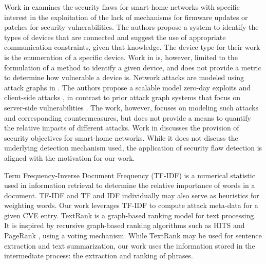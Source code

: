 Work in \cite{miettinen2017iot} examines the security flaws for smart-home networks with specific interest in the exploitation of the lack of mechanisms for firmware updates or patches for security vulnerabilities. The authors propose a system to identify the types of devices that are connected and suggest the use of appropriate communication constraints, given that knowledge. The device type for their work is the enumeration of a specific device. Work in \cite{miettinen2017iot} is, however, limited to the formulation of a method to identify a given device, and does not provide a metric to determine how vulnerable a device is. Network attacks are modeled using attack graphs in \cite{ingols2009modeling}. The authors propose a scalable model zero-day exploits \cite{turner2005symantec} and client-side attacks \cite{choo2011cyber,chang2009your}, in contrast to prior attack graph systems that focus on server-side vulnerabilities \cite{noel2008optimal,lippmann2005annotated}. The work, however, focuses on modeling such attacks and corresponding countermeasures, but does not provide a means to quantify the relative impacts of different attacks. Work in \cite{matsuoka2015security} discusses the provision of security objectives for smart-home networks. While it does not discuss the underlying detection mechanism used, the application of security flaw detection is aligned with the motivation for our work.

Term Frequency-Inverse Document Frequency (TF-IDF) \cite{leskovec2014mining} is a numerical statistic used in information retrieval to determine the relative importance of words in a document. TF-IDF and TF and IDF individually may also serve as heuristics for weighting words. Our work leverages TF-IDF to compute attack meta-data for a given CVE entry. TextRank \cite{mihalcea2004textrank,PyTextRank} is a graph-based ranking model for text processing. It is inspired by recursive graph-based ranking algorithms such as HITS \cite{kleinberg1999authoritative} and PageRank \cite{page1999pagerank}, using a voting mechanism. While TextRank may be used for sentence extraction and text summarization, our work uses the information stored in the intermediate process: the extraction and ranking of phrases.